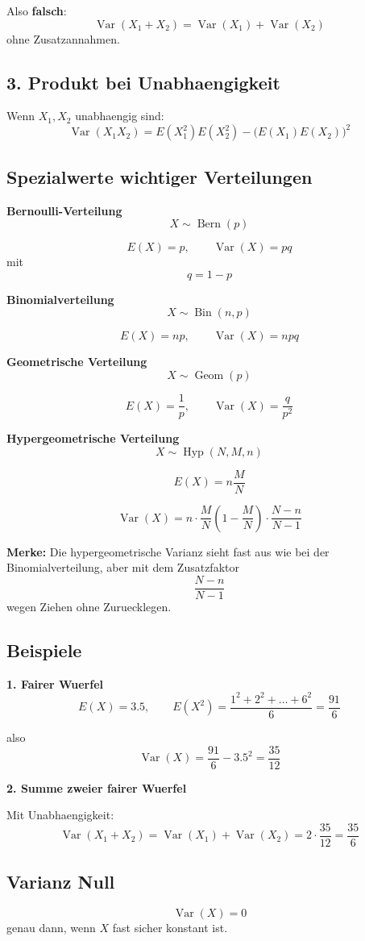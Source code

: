 \documentclass[a4paper,11pt]{article}
\begin{document}
Also \textbf{falsch}:
\[
\operatorname{Var}(X_1+X_2)=\operatorname{Var}(X_1)+\operatorname{Var}(X_2)
\]
ohne Zusatzannahmen.

\subsection{3. Produkt bei Unabhaengigkeit}
Wenn $X_1,X_2$ unabhaengig sind:
\[
\operatorname{Var}(X_1X_2)=E(X_1^2)E(X_2^2)-\big(E(X_1)E(X_2)\big)^2
\]

\subsection{Spezialwerte wichtiger Verteilungen}
\textbf{Bernoulli-Verteilung}
\[
X \sim \operatorname{Bern}(p)
\]

\[
E(X)=p,\qquad \operatorname{Var}(X)=pq
\]
mit
\[
q=1-p
\]

\textbf{Binomialverteilung}
\[
X \sim \operatorname{Bin}(n,p)
\]

\[
E(X)=np,\qquad \operatorname{Var}(X)=npq
\]

\textbf{Geometrische Verteilung}
\[
X \sim \operatorname{Geom}(p)
\]

\[
E(X)=\frac1p,\qquad \operatorname{Var}(X)=\frac{q}{p^2}
\]

\textbf{Hypergeometrische Verteilung}
\[
X \sim \operatorname{Hyp}(N,M,n)
\]

\[
E(X)=n\frac{M}{N}
\]

\[
\operatorname{Var}(X)=
n\cdot \frac{M}{N}\left(1-\frac{M}{N}\right)\cdot \frac{N-n}{N-1}
\]

\textbf{Merke:}
Die hypergeometrische Varianz sieht fast aus wie bei der Binomialverteilung, aber mit dem Zusatzfaktor
\[
\frac{N-n}{N-1}
\]
wegen Ziehen ohne Zuruecklegen.

\subsection{Beispiele}
\textbf{1. Fairer Wuerfel}
\[
E(X)=3.5,\qquad E(X^2)=\frac{1^2+2^2+\dots+6^2}{6}=\frac{91}{6}
\]

also
\[
\operatorname{Var}(X)=\frac{91}{6}-3.5^2=\frac{35}{12}
\]

\textbf{2. Summe zweier fairer Wuerfel}

Mit Unabhaengigkeit:
\[
\operatorname{Var}(X_1+X_2)=\operatorname{Var}(X_1)+\operatorname{Var}(X_2)=2\cdot \frac{35}{12}=\frac{35}{6}
\]

\subsection{Varianz Null}
\[
\operatorname{Var}(X)=0
\]
genau dann, wenn $X$ fast sicher konstant ist.
\end{document}
